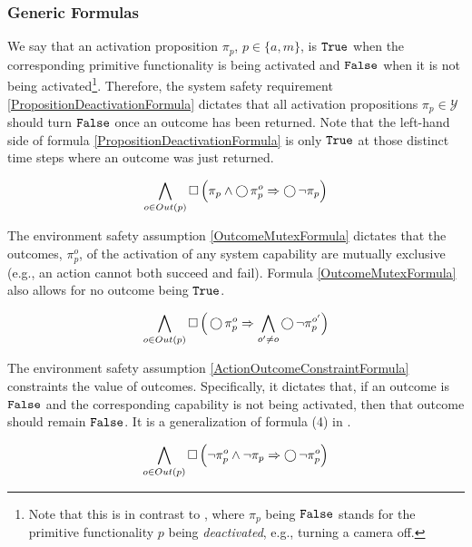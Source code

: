 \subsubsection{Generic Formulas}

We say that an activation proposition $\pi_p$, $p \in \{a, m\}$, is $\mathtt{True}$ when the corresponding primitive functionality is being activated and $\mathtt{False}$ when it is not being activated\footnote{Note that this is in contrast to \cite{Vasu2013ICRA}, where $\pi_p$ being $\mathtt{False}$ stands for the primitive functionality $p$ being \emph{deactivated}, e.g., turning a camera off.}.
Therefore, the system safety requirement \eqref{PropositionDeactivationFormula} dictates that all activation propositions $\pi_p \in \mathcal{Y}$ should turn $\mathtt{False}$ once an outcome has been returned.
Note that the left-hand side of formula \eqref{PropositionDeactivationFormula} is only $\mathtt{True}$ at those distinct time steps where an outcome was just returned.

\begin{equation}\label{PropositionDeactivationFormula}
	\bigwedge \limits_{o \in Out(p)} \operatorname{\Box} \Big( \pi_p \wedge \operatorname{\bigcirc} \pi_p^o \Rightarrow \operatorname{\bigcirc} \lnot \pi_p \Big)
\end{equation}

The environment safety assumption \eqref{OutcomeMutexFormula} dictates that the outcomes, $\pi_p^o$, of the activation of any system capability are mutually exclusive (e.g., an action cannot both succeed and fail).
Formula \eqref{OutcomeMutexFormula} also allows for no outcome being $\mathtt{True}$.

\begin{equation}\label{OutcomeMutexFormula}
	\bigwedge \limits_{o \in Out(p)} \operatorname{\Box} \Big( \operatorname{\bigcirc} \pi_p^o \Rightarrow \bigwedge \limits_{o^\prime \neq o} \operatorname{\bigcirc} \lnot \pi_p^{o^\prime} \Big)
\end{equation}

The environment safety assumption \eqref{ActionOutcomeConstraintFormula} constraints the value of outcomes.
Specifically, it dictates that, if an outcome is $\mathtt{False}$ and the corresponding capability is not being activated, then that outcome should remain $\mathtt{False}$.
It is a generalization of formula (4) in \cite{Vasu2013ICRA}.

\begin{equation}\label{ActionOutcomeConstraintFormula}
	\bigwedge \limits_{o \in Out(p)} \operatorname{\Box} \Big( \lnot \pi_p^o \wedge \lnot \pi_p \Rightarrow \operatorname{\bigcirc} \lnot \pi_p^o \Big)
\end{equation}

